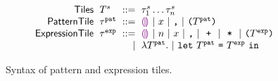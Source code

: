 \begin{figure}
  \vspace{-3px}
  \[
  \arraycolsep=3pt\begin{array}{rlrl}
      \mathsf{Tiles} & \tiles^s & ::= & \tile^s_1\dots\tile^s_n \\
      \mathsf{PatternTile} & \tile^{\pat} & ::= &
        \shole ~\vert~
        \svar{x} ~\vert~
        \sprod{}{} ~\vert~
        \sparen{\tiles^{\pat}}\\
      \mathsf{ExpressionTile} & \tile^{\expr} & ::= &
        \shole ~\vert~
        \snumlit{n} ~\vert~
        \svar{x} ~\vert~
        \sprod{}{} ~\vert~
        \splus{}{} ~\vert~
        \smult{}{} ~\vert~
        \sparen{\tiles^{\expr}} \\
      & & \vert &
        \slam{\tiles^{\pat}}{} ~\vert~
        \slet{\tiles^{\pat}}{\tiles^{\expr}}{} %
  \end{array}\]
  \caption{
    Syntax of pattern and expression tiles.
  }
  \label{fig:tile-syntax}
\end{figure}
